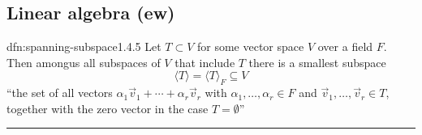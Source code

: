 \documentclass[landscape, 8pt]{extarticle}
\begin{document}
\begin{multicols}{3}
%
%
%

\vspace{-8pt}
\section{Linear algebra (ew)}

\vspace{-5pt}
\begin{dfn}{dfn:spanning-subspace}{1.4.5}
    \vspace{-5pt}
    Let $T \subset V$ for some vector space $V$ over a field $F$. Then amongus all subspaces of $V$ that include $T$ there is a smallest subspace
    \[\langle T \rangle = \langle T \rangle_{F} \subseteq V\]
    ``the set of all vectors $\alpha_{1}\vec{v}_{1} + \cdots + \alpha_{r}\vec{v}_{r}$ with $\alpha_{1},\dots,\alpha_{r}\in F$ and $\vec{v}_{1},\dots,\vec{v}_{r}\in T$, together with the zero vector in the case $T = \emptyset$''


    \noindent\rule{\textwidth}{0.2pt}


\end{dfn}
\end{multicols}
\end{document}
